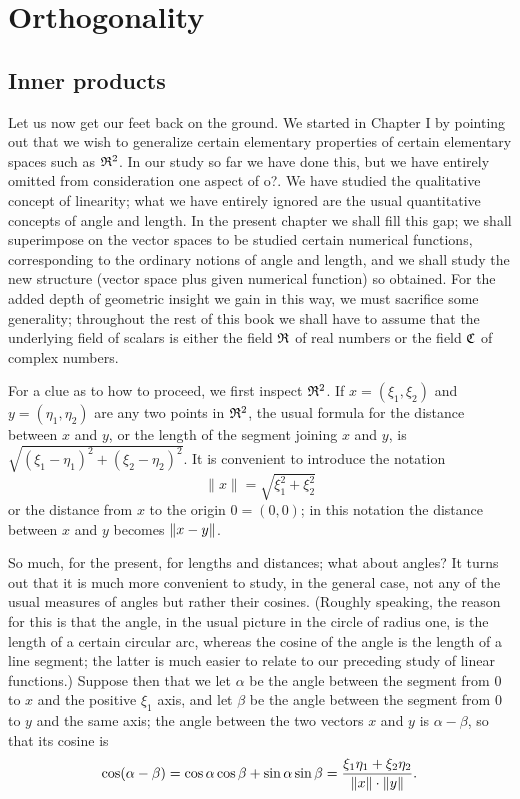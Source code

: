 \chapter{Orthogonality}

\section{Inner products}

Let us now get our feet back on the ground. We started in Chapter I by pointing
out that we wish to generalize certain elementary properties of certain
elementary spaces such as \(\frak{R}^2\). In our study so far we have done this,
but we have entirely omitted from consideration one aspect of o?. We have
studied the qualitative concept of linearity; what we have entirely ignored are
the usual quantitative concepts of angle and length. In the present chapter we
shall fill this gap; we shall superimpose on the vector spaces to be studied
certain numerical functions, corresponding to the ordinary notions of angle and
length, and we shall study the new structure (vector space plus given numerical
function) so obtained. For the added depth of geometric insight we gain in this
way, we must sacrifice some generality; throughout the rest of this book we
shall have to assume that the underlying field of scalars is either the field
\(\frak{R}\) of real numbers or the field \(\frak{C}\) of complex numbers.

For a clue as to how to proceed, we first inspect \(\frak{R}^2\). If \(x = (\xi_1,
\xi_2)\) and \(y= (\eta_1, \eta_2)\) are any two points in \(\frak{R}^2\), the
usual formula for the distance between \(x\) and \(y\), or the length of the segment
joining \(x\) and \(y\), is \(\sqrt{(\xi_1 - \eta_1)^2 + (\xi_2 - \eta_2)^2}\). It is convenient to introduce the notation
\begin{equation*}
    \|x\| = \sqrt{\xi_1^2 + \xi_2^2}
\end{equation*}
or the distance from \(x\) to the origin \(0 = (0, 0)\); in this notation the
distance between \(x\) and \(y\) becomes \(\left\lVert x-y\right\rVert\).

So much, for the present, for lengths and distances; what about angles? It turns
out that it is much more convenient to study, in the general case, not any of
the usual measures of angles but rather their cosines. (Roughly speaking, the
reason for this is that the angle, in the usual picture in the circle of radius
one, is the length of a certain circular arc, whereas the cosine of the angle is
the length of a line segment; the latter is much easier to relate to our
preceding study of linear functions.) Suppose then that we let \(\alpha\) be the
angle between the segment from \(0\) to \(x\) and the positive \(\xi_1\) axis,
and let \(\beta\) be the angle between the segment from \(0\) to \(y\) and the
same axis; the angle between the two vectors \(x\) and \(y\) is \(\alpha -
\beta\), so that its cosine is
\begin{equation*}
    \cos(\alpha - \beta) = \cos\alpha\cos\beta + \sin\alpha\sin\beta = \frac{\xi_1\eta_1 + \xi_2\eta_2}{\left\lVert x\right\rVert\cdot\left\lVert y\right\rVert}.
\end{equation*}

